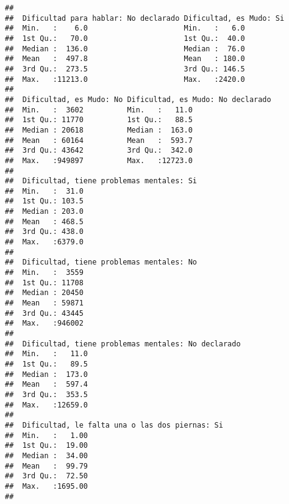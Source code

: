 \documentclass[11pt,]{article}
\begin{document}
\begin{verbatim}
##                                                       
##  Dificultad para hablar: No declarado Dificultad, es Mudo: Si
##  Min.   :    6.0                      Min.   :   6.0         
##  1st Qu.:   70.0                      1st Qu.:  40.0         
##  Median :  136.0                      Median :  76.0         
##  Mean   :  497.8                      Mean   : 180.0         
##  3rd Qu.:  273.5                      3rd Qu.: 146.5         
##  Max.   :11213.0                      Max.   :2420.0         
##                                                              
##  Dificultad, es Mudo: No Dificultad, es Mudo: No declarado
##  Min.   :  3602          Min.   :   11.0                  
##  1st Qu.: 11770          1st Qu.:   88.5                  
##  Median : 20618          Median :  163.0                  
##  Mean   : 60164          Mean   :  593.7                  
##  3rd Qu.: 43642          3rd Qu.:  342.0                  
##  Max.   :949897          Max.   :12723.0                  
##                                                           
##  Dificultad, tiene problemas mentales: Si
##  Min.   :  31.0                          
##  1st Qu.: 103.5                          
##  Median : 203.0                          
##  Mean   : 468.5                          
##  3rd Qu.: 438.0                          
##  Max.   :6379.0                          
##                                          
##  Dificultad, tiene problemas mentales: No
##  Min.   :  3559                          
##  1st Qu.: 11708                          
##  Median : 20450                          
##  Mean   : 59871                          
##  3rd Qu.: 43445                          
##  Max.   :946002                          
##                                          
##  Dificultad, tiene problemas mentales: No declarado
##  Min.   :   11.0                                   
##  1st Qu.:   89.5                                   
##  Median :  173.0                                   
##  Mean   :  597.4                                   
##  3rd Qu.:  353.5                                   
##  Max.   :12659.0                                   
##                                                    
##  Dificultad, le falta una o las dos piernas: Si
##  Min.   :   1.00                               
##  1st Qu.:  19.00                               
##  Median :  34.00                               
##  Mean   :  99.79                               
##  3rd Qu.:  72.50                               
##  Max.   :1695.00                               
##                                                

\end{verbatim}
\end{document}
